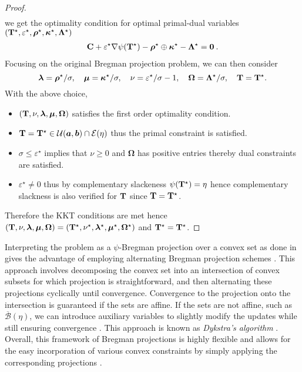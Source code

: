 \begin{proof}
\begin{align}
    \end{align}
    we get the optimality condition for optimal primal-dual variables $({\mathbf{T}}^\star, \varepsilon^\star, \bm{\rho}^\star, \bm{\kappa}^\star, \mathbf{\Lambda}^\star)$
    \begin{align}
        \mathbf{C} + \varepsilon^\star \nabla \psi({\mathbf{T}}^\star) -  \bm{\rho}^\star \oplus \bm{\kappa}^{\star} - \mathbf{\Lambda}^\star = \bm{0} \:.
    \end{align}
    Focusing on the original Bregman projection problem, we can then consider
    \[
    \bm{\lambda} = \bm{\rho}^\star / \sigma, \quad \bm{\mu} = \bm{\kappa}^\star / \sigma, \quad \nu = \varepsilon^\star / \sigma - 1, \quad \mathbf{\Omega} = \mathbf{\Lambda}^\star / \sigma, \quad {\mathbf{T}} = {\mathbf{T}}^\star.
    \]
    With the above choice, 
    \begin{itemize}
        \item  $({\mathbf{T}}, \nu, \bm{\lambda}, \bm{\mu}, \mathbf{\Omega})$ satisfies the first order optimality condition.
        \item ${\mathbf{T}} = {\mathbf{T}}^\star \in {\mathcal{U}}(\bm{a}, \bm{b}) \cap \mathcal{E}(\eta)$ thus the primal constraint is satisfied. 
        \item $\sigma \leq \varepsilon^\star$ implies that $\nu \geq 0$ and $\mathbf{\Omega}$ has positive entries thereby dual constraints are satisfied. 
        \item $\varepsilon^\star \neq 0$ thus by complementary slackeness $\psi({\mathbf{T}}^\star) = \eta$ hence complementary slackness is also verified for ${\mathbf{T}}$ since ${\mathbf{T}} = {\mathbf{T}}^\star$.
    \end{itemize}
    Therefore the KKT conditions are met hence $({\mathbf{T}}, \nu, \bm{\lambda}, \bm{\mu}, \mathbf{\Omega}) = ({\mathbf{T}}^\star, \nu^\star, \bm{\lambda}^\star, \bm{\mu}^\star, \mathbf{\Omega}^\star)$ and ${\mathbf{T}}^\star = {\mathbf{T}}^\star$.
\end{proof}

Interpreting the problem as a $\psi$-Bregman projection over a convex set as done in  gives the advantage of employing alternating Bregman projection schemes \citep{benamou2015iterative}. This approach involves decomposing the convex set into an intersection of convex subsets for which projection is straightforward, and then alternating these projections cyclically until convergence. Convergence to the projection onto the intersection is guaranteed if the sets are affine. If the sets are not affine, such as $\overline{\mathcal{B}}(\eta)$, we can introduce auxiliary variables to slightly modify the updates while still ensuring convergence \citep{censor1998dykstra}. This approach is known as \emph{Dykstra's algorithm} \citep{dykstra1983algorithm}. Overall, this framework of Bregman projections is highly flexible and allows for the easy incorporation of various convex constraints by simply applying the corresponding projections \citep{benamou2015iterative}.

